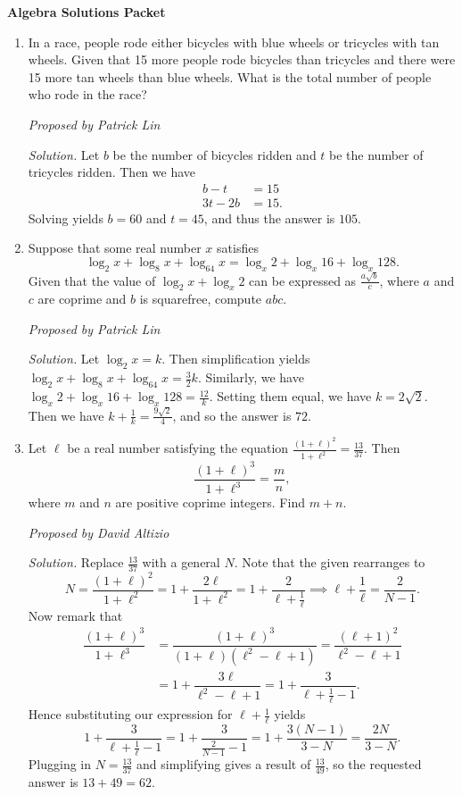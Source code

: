 \documentclass[10pt]{article}
\newcommand{\proposed}[1]
{
\vspace{5pt}
\noindent\textit{Proposed by #1}
}
\newcommand{\solution}
{
\vspace{5pt}
\noindent\textit{Solution.}\qquad
}
\begin{document}
\begin{center}
\huge\textbf{Algebra Solutions Packet}\normalsize

\vspace{3pt}
\end{center}

\begin{enumerate}

\item In a race, people rode either bicycles with blue wheels or tricycles with
tan wheels. Given that 15 more people rode bicycles than tricycles and there
were 15 more tan wheels than blue wheels.  What is the total number of people
who rode in the race?

\proposed{Patrick Lin}

\solution Let $b$ be the number of bicycles ridden and $t$ be the number of tricycles ridden. Then we have
\begin{align*}
b - t & = 15 \\
3t - 2b & = 15.
\end{align*}
Solving yields $b = 60$ and $t = 45$, and thus the answer is $\boxed{105}$.
\item Suppose that some real number $x$ satisfies
\[\log_2 x + \log_8 x + \log_{64} x = \log_x 2 + \log_x 16 + \log_x 128.\]
Given that the value of $\log_2 x + \log_x 2$ can be expressed as $\tfrac{a\sqrt{b}}{c}$, where $a$ and $c$ are coprime and $b$ is squarefree, compute $abc$.

\proposed{Patrick Lin}

\solution Let $\log_2 x = k$. Then simplification yields $\log_2 x + \log_8 x + \log_{64} x = \tfrac32 k$. Similarly, we have $\log_x 2 + \log_x 16 + \log_x 128 = \tfrac{12}{k}$. Setting them equal, we have $k = 2\sqrt{2}$. Then we have $k + \tfrac{1}{k} = \frac{9\sqrt{2}}{4}$, and so the answer is $\boxed{72}$.


\item Let $\ell$ be a real number satisfying the equation
$\tfrac{(1+\ell)^2}{1+\ell^2}=\tfrac{13}{37}$.  Then
\[\frac{(1+\ell)^3}{1+\ell^3}=\frac mn,\] where $m$ and $n$ are positive
coprime integers.  Find $m+n$.

\proposed{David Altizio}

\solution Replace $\tfrac{13}{37}$ with a general $N$.  Note that the given rearranges to \[N=\dfrac{(1+\ell)^2}{1+\ell^2}=1+\dfrac{2\ell}{1+\ell^2}=1+\dfrac{2}{\ell+\frac1{\ell}}\implies \ell+\frac1{\ell}=\frac{2}{N-1}.\] Now remark that \begin{align*}\dfrac{(1+\ell)^3}{1+\ell^3}&=\dfrac{(1+\ell)^3}{(1+\ell)(\ell^2-\ell+1)}=\dfrac{(\ell+1)^2}{\ell^2-\ell+1}\\&=1+\dfrac{3\ell}{\ell^2-\ell+1}=1+\dfrac{3}{\ell+\frac{1}{\ell}-1}.\end{align*} Hence substituting our expression for $\ell+\tfrac1{\ell}$ yields \[1+\dfrac3{\ell+\frac1{\ell}-1}=1+\dfrac{3}{\frac{2}{N-1}-1}=1+\dfrac{3(N-1)}{3-N}=\dfrac{2N}{3-N}.\] Plugging in $N=\tfrac{13}{37}$ and simplifying gives a result of $\tfrac{13}{49}$, so the requested answer is $13+49=\boxed{62}$.


\end{enumerate}
\end{document}
